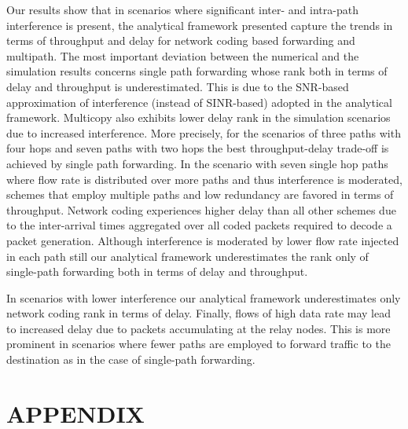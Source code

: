 \documentclass[journal, onecolumn, 12pt]{IEEEtran}
\begin{document}
Our results show that in scenarios where significant inter- and intra-path interference is present, the analytical framework presented capture the trends in terms of throughput and delay for network coding based
forwarding and multipath.
The most important deviation between the numerical and the simulation results concerns single path forwarding whose rank both in terms of delay and throughput is underestimated.
This is due to the SNR-based approximation of interference (instead of SINR-based) adopted in the analytical framework.
Multicopy also exhibits lower delay rank in the simulation scenarios due to increased interference.
More precisely, for the scenarios of three paths with four hops and seven paths with two hops the best throughput-delay trade-off is achieved by single path forwarding.
In the scenario with seven single hop paths where flow rate is distributed over more paths and thus interference is moderated, schemes that employ multiple paths and low redundancy are favored in terms of throughput.
Network coding experiences higher delay than all other schemes due to the inter-arrival times aggregated over all coded packets required to decode a packet generation.
Although interference is moderated by lower flow rate injected in each path still our analytical framework underestimates the rank only of single-path forwarding both in terms of delay and throughput.

In scenarios with lower interference our analytical framework underestimates only network coding rank in terms of delay.
Finally, flows of high data rate may lead to increased delay due to packets accumulating at the relay nodes.
This is more prominent in scenarios where fewer paths are employed to forward traffic to the destination as in the case of single-path forwarding.





\section*{\uppercase{Appendix}}
\label{sec:appendix}
\end{document}
